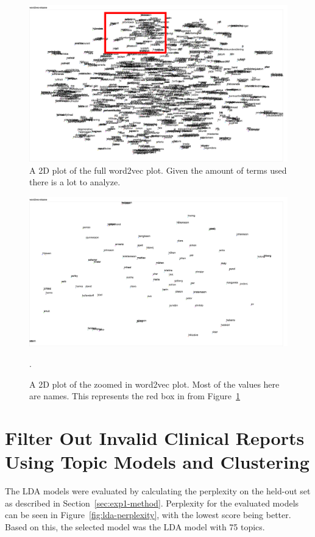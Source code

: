\begin{figure}
    \centering
    \includegraphics[scale=0.25]{figures/word2vec-overview.png}
    \caption{A 2D plot of the full word2vec plot. Given the amount of terms used there is a lot to analyze.}
    \label{fig:word2vec-overview}
\end{figure}

\begin{figure}
    \centering
    \includegraphics[scale=0.25]{figures/word2vec-names.png}
    \caption{A 2D plot of the zoomed in word2vec plot. Most of the values here are names. This represents the red box in from Figure~\ref{fig:word2vec-overview}}.
    \label{fig:word2vec-names}
\end{figure}

\section{Filter Out Invalid Clinical Reports Using Topic Models and Clustering}\label{sec:exp1-result}

The LDA models were evaluated by calculating the perplexity on the held-out set as described in Section~\ref{sec:exp1-method}.
Perplexity for the evaluated models can be seen in Figure~\ref{fig:lda-perplexity}, with the lowest score being better.
Based on this, the selected model was the LDA model with 75 topics.

